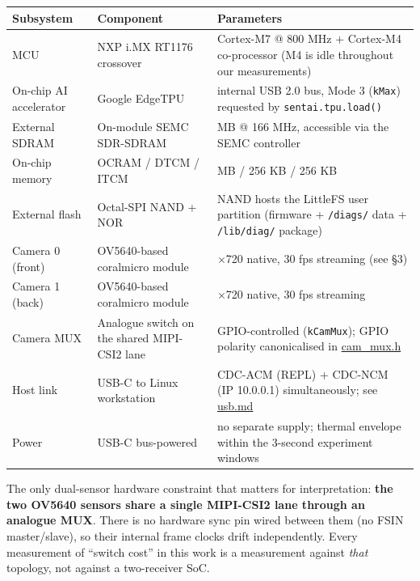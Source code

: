{\def\LTcaptype{none} %
\begin{longtable}[]{@{}
  >{\raggedright\arraybackslash}p{}
  >{\raggedright\arraybackslash}p{}
  >{\raggedright\arraybackslash}p{}@{}}
\toprule\noalign{}
\begin{minipage}[b]{\linewidth}\raggedright
Subsystem
\end{minipage} & \begin{minipage}[b]{\linewidth}\raggedright
Component
\end{minipage} & \begin{minipage}[b]{\linewidth}\raggedright
Parameters
\end{minipage} \\
\midrule\noalign{}
\endhead
\bottomrule\noalign{}
\endlastfoot
MCU & NXP i.MX RT1176 crossover & Cortex-M7 @ 800 MHz + Cortex-M4
co-processor (M4 is idle throughout our measurements) \\
On-chip AI accelerator & Google EdgeTPU & internal USB 2.0 bus, Mode 3
(\texttt{kMax}) requested by \texttt{sentai.tpu.load()} \\
External SDRAM & On-module SEMC SDR-SDRAM & 16 MB @ 166 MHz, accessible
via the SEMC controller \\
On-chip memory & OCRAM / DTCM / ITCM & 1.25 MB / 256 KB / 256 KB \\
External flash & Octal-SPI NAND + NOR & NAND hosts the LittleFS user
partition (firmware + \texttt{/diags/} data + \texttt{/lib/diag/}
package) \\
Camera 0 (front) & OV5640-based coralmicro module & 1280×720 native, 30
fps streaming (see §3) \\
Camera 1 (back) & OV5640-based coralmicro module & 1280×720 native, 30
fps streaming \\
Camera MUX & Analogue switch on the shared MIPI-CSI2 lane &
GPIO-controlled (\texttt{kCamMux}); GPIO polarity canonicalised in
\href{../../../libs/camera/cam_mux.h}{cam\_mux.h} \\
Host link & USB-C to Linux workstation & CDC-ACM (REPL) + CDC-NCM (IP
10.0.0.1) simultaneously; see \url{usb.md} \\
Power & USB-C bus-powered & no separate supply; thermal envelope within
the 3-second experiment windows \\
\end{longtable}
}

The only dual-sensor hardware constraint that matters for
interpretation: \textbf{the two OV5640 sensors share a single MIPI-CSI2
lane through an analogue MUX}. There is no hardware sync pin wired
between them (no FSIN master/slave), so their internal frame clocks
drift independently. Every measurement of ``switch cost'' in this work
is a measurement against \emph{that} topology, not against a
two-receiver SoC.

